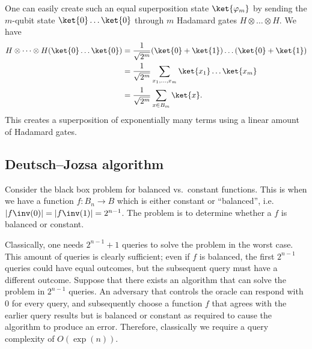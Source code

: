 One can easily create such an equal superposition state $\ket{\varphi_m}$ by sending the $m$-qubit state $\ket{0} \dots \ket{0}$ through $m$ Hadamard gates $H \otimes \dots \otimes H$.
We have
\begin{align*}
    H \otimes \dots \otimes H (\ket{0} \dots \ket{0}) &= \frac{1}{\sqrt{2^m}} (\ket{0} + \ket{1}) \dots (\ket{0} + \ket{1}) \\
    &= \frac{1}{\sqrt{2^m}} \sum_{x_1, \dots, x_m} \ket{x_1} \dots \ket{x_m} \\
    &= \frac{1}{\sqrt{2^m}} \sum_{x \in B_m} \ket{x}.
\end{align*}
This creates a superposition of exponentially many terms using a linear amount of Hadamard gates.

\subsection{Deutsch--Jozsa algorithm}
Consider the black box problem for balanced vs.\ constant functions.
This is when we have a function $f : B_n \to B$ which is either constant or ``balanced'', i.e. $|f\inv(0)| = |f\inv(1)| = 2^{n-1}$.
The problem is to determine whether a $f$ is balanced or constant.

Classically, one needs $2^{n-1} + 1$ queries to solve the problem in the worst case.
This amount of queries is clearly sufficient; even if $f$ is balanced, the first $2^{n-1}$ queries could have equal outcomes, but the subsequent query must have a different outcome.
Suppose that there exists an algorithm that can solve the problem in $2^{n-1}$ queries.
An adversary that controls the oracle can respond with 0 for every query, and subsequently choose a function $f$ that agrees with the earlier query results but is balanced or constant as required to cause the algorithm to produce an error.
Therefore, classically we require a query complexity of $O(\exp(n))$.


